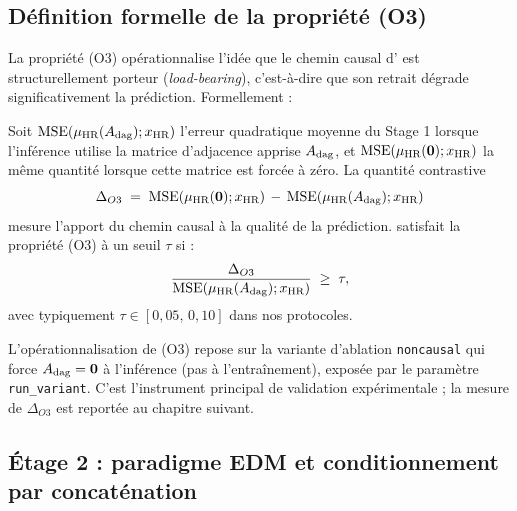 \subsection{Définition formelle de la propriété (O3)}
\label{ssec:oracle-o3-def}

La propriété (O3) opérationnalise l'idée que le chemin causal d'\Oracle{} est structurellement porteur (\emph{load-bearing}), c'est-à-dire que son retrait dégrade significativement la prédiction. Formellement :

\begin{definition}\label{def:o3}
Soit $\mathrm{MSE}\!\left( \mu_{\text{HR}}(A_{\mathrm{dag}}); x_{\text{HR}} \right)$ l'erreur quadratique moyenne du Stage 1 lorsque l'inférence utilise la matrice d'adjacence apprise $A_{\mathrm{dag}}$, et $\mathrm{MSE}\!\left( \mu_{\text{HR}}(\mathbf{0}); x_{\text{HR}} \right)$ la même quantité lorsque cette matrice est forcée à zéro. La quantité contrastive
\begin{equation}
  \Delta_{O3} \;=\; \mathrm{MSE}\!\left( \mu_{\text{HR}}(\mathbf{0}); x_{\text{HR}} \right) \,-\, \mathrm{MSE}\!\left( \mu_{\text{HR}}(A_{\mathrm{dag}}); x_{\text{HR}} \right)
  \label{eq:delta-o3}
\end{equation}
mesure l'apport du chemin causal à la qualité de la prédiction. \Oracle{} satisfait la propriété (O3) à un seuil $\tau$ si :
\begin{equation}
  \frac{\Delta_{O3}}{\mathrm{MSE}\!\left( \mu_{\text{HR}}(A_{\mathrm{dag}}); x_{\text{HR}} \right)} \;\geq\; \tau,
  \label{eq:o3-criterion}
\end{equation}
avec typiquement $\tau \in [0{,}05,\, 0{,}10]$ dans nos protocoles.
\end{definition}

L'opérationnalisation de (O3) repose sur la variante d'ablation \texttt{noncausal} qui force $A_{\mathrm{dag}} = \mathbf{0}$ à l'inférence (pas à l'entraînement), exposée par le paramètre \texttt{run\_variant}. C'est l'instrument principal de validation expérimentale ; la mesure de $\Delta_{O3}$ est reportée au chapitre suivant.

\subsection{Étage 2 : paradigme EDM et conditionnement par concaténation}
\label{sec:oracle-edm}

